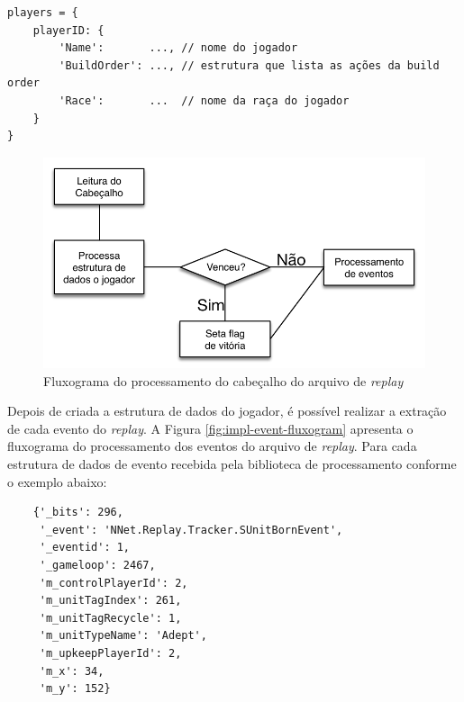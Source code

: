 \begin{lstlisting}
players = {
	playerID: {
		'Name':       ..., // nome do jogador
		'BuildOrder': ..., // estrutura que lista as ações da build order
		'Race':       ...  // nome da raça do jogador
	}
}
\end{lstlisting}

\begin{figure}[htb]
	\caption{\label{fig:impl-header-fluxogram} Fluxograma do processamento do cabeçalho do arquivo de \textit{\gls{replay}}}
	\begin{center}
	    \includegraphics[width=\linewidth]{Images/Replay-Header_Parsing-Fluxogram.pdf}
	\end{center}
\end{figure}

Depois de criada a estrutura de dados do jogador, é possível realizar a extração de cada evento do \textit{\gls{replay}}. A Figura \ref{fig:impl-event-fluxogram} apresenta o fluxograma do processamento dos eventos do arquivo de \textit{\gls{replay}}. Para cada estrutura de dados de evento recebida pela biblioteca de processamento conforme o exemplo abaixo:

\begin{lstlisting}
	{'_bits': 296,
	 '_event': 'NNet.Replay.Tracker.SUnitBornEvent',
	 '_eventid': 1,
	 '_gameloop': 2467,
	 'm_controlPlayerId': 2,
	 'm_unitTagIndex': 261,
	 'm_unitTagRecycle': 1,
	 'm_unitTypeName': 'Adept',
	 'm_upkeepPlayerId': 2,
	 'm_x': 34,
	 'm_y': 152}
\end{lstlisting}


